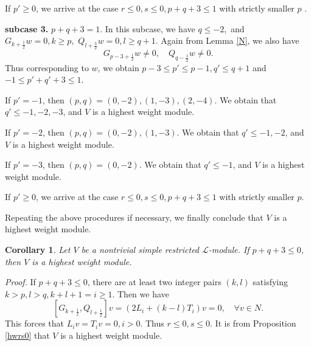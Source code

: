 \documentclass[12pt]{article}
\numberwithin{equation}{section}
\newtheorem{coro}[theo]{Corollary}
\begin{document}
If $p'\ge 0$,  we arrive at the case $r\le 0,s\le 0, p+q+3\le 1$ with strictly smaller $p$ .


{\bf subcase 3.} $p+q+3=1$. In this subcase, we have $q\le -2,$ and  $G_{k+\frac{1}{2}}w=0, k\ge p,$ $Q_{l+\frac{3}{2}}w=0, l\ge q+1.$ Again from Lemma \ref{N}, we also have
$$G_{p-3+\frac{1}{2}}w\ne 0, \quad Q_{q-\frac{1}{2}}w\ne 0.$$
Thus  corresponding to  $w$, we obtain $p-3\le p'\le p-1, q'\le q+1$ and $-1\le p'+q'+3\le 1.$

If $p'=-1$, then $(p,q)=(0,-2),(1,-3),(2,-4)$. We obtain that $q'\le -1,-2,-3$, and $V$ is a highest weight module.

If $p'=-2$, then $(p,q)=(0,-2),(1,-3)$. We obtain that $q'\le -1,-2$, and $V$ is a highest weight module.

If $p'=-3$, then $(p,q)=(0,-2)$. We obtain that $q'\le -1$, and $V$ is a highest weight module.

If $p'\ge 0$,  we arrive at  the case $r\le 0,s\le 0, p+q+3\le 1$ with  strictly smaller $p$.

Repeating  the above procedures if necessary, we finally conclude  that $V$ is a highest weight module.



\begin{coro}\label{pq0} Let $V$ be a nontrivial simple  restricted $\mathcal{L}$-module.  If $p+q+3\le 0$, then $V$ is a highest weight module.
\end{coro}

{\it Proof.} If $p+q+3\le 0$,  there are at least two integer pairs $(k,l)$ satisfying $k>p,l>q, k+l+1=i\ge 1$. Then we have
$$[G_{k+\frac{1}{2}},Q_{l+\frac{1}{2}}]v=(2L_i+(k-l)T_i)v=0,\quad \forall v\in N.$$
This forces that $L_iv=T_iv=0,i>0$. Thus $r\le 0,s\le 0$. It is  from Proposition \ref{hwrs0} that $V$ is a highest weight module.
\end{document}
